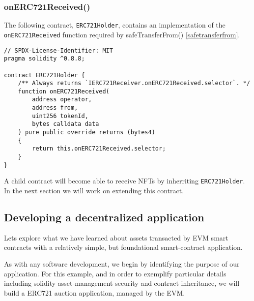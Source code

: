 \documentclass{article}
\theoremstyle{theorem}
\theoremstyle{definition}
\theoremstyle{remark}
\begin{document}
\subsubsection{onERC721Received()}\label{onerc721received}

\medskip\noindent
The following contract, \texttt{ERC721Holder}, contains an implementation of the \texttt{onERC721Received} function required by \colorbox{Gainsboro!60!Lavender}{safeTransferFrom()} \ref{safetransferfrom}. 

\medskip\noindent
\begin{itemize}
\begin{lstlisting}
// SPDX-License-Identifier: MIT
pragma solidity ^0.8.8;

contract ERC721Holder {
    /** Always returns `IERC721Receiver.onERC721Received.selector`. */
    function onERC721Received( 
        address operator, 
        address from, 
        uint256 tokenId, 
        bytes calldata data 
    ) pure public override returns (bytes4) 
    {
        return this.onERC721Received.selector;
    }
}
\end{lstlisting}
\end{itemize}

\medskip\noindent
A child contract will become able to receive NFTs by inherriting \texttt{ERC721Holder}. In the next section we will work on extending this contract.

\subsection{Developing a decentralized application}

Lets explore what we have learned about assets transacted by EVM smart contracts with a relatively simple, but foundational smart-contract application.

\medskip\noindent
As with any software development, we begin by identifying the purpose of our application. For this example, and in order to exemplify particular details including solidity asset-management security and contract inheritance, we will build a ERC721 auction application, managed by the EVM. 
\end{document}

